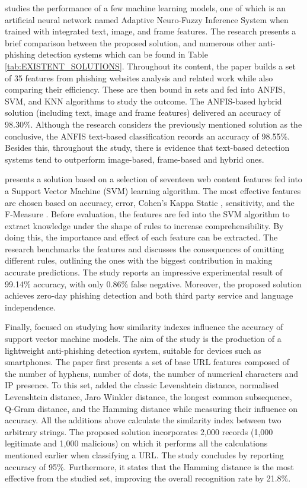 \cite{Adebowale} studies the performance of a few machine learning models, one of which is an artificial neural network named Adaptive Neuro-Fuzzy Inference System \citep{Jang} when trained with integrated text, image, and frame features. The research presents a brief comparison between the proposed solution, and numerous other anti-phishing detection systems which can be found in Table \ref{tab:EXISTENT_SOLUTIONS}.
Throughout its content, the paper builds a set of 35 features from phishing websites analysis and related work while also comparing their efficiency. These are then bound in sets and fed into ANFIS, SVM, and KNN algorithms to study the outcome.
The ANFIS-based hybrid solution (including text, image and frame features) delivered an accuracy of 98.30\%. Although the research considers the previously mentioned solution as the conclusive, the ANFIS text-based classification records an accuracy of 98.55\%. Besides this, throughout the study, there is evidence that text-based detection systems tend to outperform image-based, frame-based and hybrid ones.

\cite{Mahmood_Moghimi} presents a solution based on a selection of seventeen web content features fed into a Support Vector Machine (SVM) learning algorithm. The most effective features are chosen based on accuracy, error, Cohen's Kappa Static \citep{Ian_Witten}, sensitivity, and the F-Measure \citep{Ian_Witten}. Before evaluation, the features are fed into the SVM algorithm to extract knowledge under the shape of rules to increase comprehensibility. By doing this, the importance and effect of each feature can be extracted. The research benchmarks the features and discusses the consequences of omitting different rules, outlining the ones with the biggest contribution in making accurate predictions. The study reports an impressive experimental result of 99.14\% accuracy, with only 0.86\% false negative. Moreover, the proposed solution achieves zero-day phishing detection and both third party service and language independence.

Finally, \cite{Mouad_Zouina} focused on studying how similarity indexes influence the accuracy of support vector machine models. The aim of the study is the production of a lightweight anti-phishing detection system, suitable for devices such as smartphones. The paper first presents a set of base URL features composed of the number of hyphens, number of dots, the number of numerical characters and IP presence. To this set, \cite{Mouad_Zouina} added the classic Levenshtein distance, normalised Levenshtein distance, Jaro Winkler distance, the longest common subsequence, Q-Gram distance, and the Hamming distance while measuring their influence on accuracy. All the additions above calculate the similarity index between two arbitrary strings. The proposed solution incorporates 2,000 records (1,000 legitimate and 1,000 malicious) on which it performs all the calculations mentioned earlier when classifying a URL. The study concludes by reporting accuracy of 95\%. Furthermore, it states that the Hamming distance is the most effective from the studied set, improving the overall recognition rate by 21.8\%.


